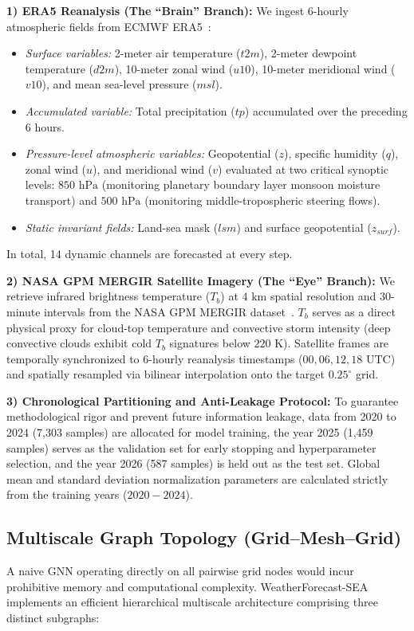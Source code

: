 \textbf{1) ERA5 Reanalysis (The ``Brain'' Branch):}
We ingest 6-hourly atmospheric fields from ECMWF ERA5~\cite{hersbach2020era5}:
\begin{itemize}
    \item \textit{Surface variables:} 2-meter air temperature ($t2m$), 2-meter dewpoint temperature ($d2m$), 10-meter zonal wind ($u10$), 10-meter meridional wind ($v10$), and mean sea-level pressure ($msl$).
    \item \textit{Accumulated variable:} Total precipitation ($tp$) accumulated over the preceding 6 hours.
    \item \textit{Pressure-level atmospheric variables:} Geopotential ($z$), specific humidity ($q$), zonal wind ($u$), and meridional wind ($v$) evaluated at two critical synoptic levels: $850\text{ hPa}$ (monitoring planetary boundary layer monsoon moisture transport) and $500\text{ hPa}$ (monitoring middle-tropospheric steering flows).
    \item \textit{Static invariant fields:} Land-sea mask ($lsm$) and surface geopotential ($z_{surf}$).
\end{itemize}
In total, 14 dynamic channels are forecasted at every step.

\textbf{2) NASA GPM MERGIR Satellite Imagery (The ``Eye'' Branch):}
We retrieve infrared brightness temperature ($T_b$) at $4\text{ km}$ spatial resolution and 30-minute intervals from the NASA GPM MERGIR dataset~\cite{janowiak2001mergir}. $T_b$ serves as a direct physical proxy for cloud-top temperature and convective storm intensity (deep convective clouds exhibit cold $T_b$ signatures below $220\text{ K}$). Satellite frames are temporally synchronized to 6-hourly reanalysis timestamps ($00, 06, 12, 18\text{ UTC}$) and spatially resampled via bilinear interpolation onto the target $0.25^\circ$ grid.

\textbf{3) Chronological Partitioning and Anti-Leakage Protocol:}
To guarantee methodological rigor and prevent future information leakage, data from 2020 to 2024 (7,303 samples) are allocated for model training, the year 2025 (1,459 samples) serves as the validation set for early stopping and hyperparameter selection, and the year 2026 (587 samples) is held out as the test set. Global mean and standard deviation normalization parameters are calculated strictly from the training years ($2020-2024$).

\subsection{Multiscale Graph Topology (Grid--Mesh--Grid)}
A naive GNN operating directly on all pairwise grid nodes would incur prohibitive memory and computational complexity. WeatherForecast-SEA implements an efficient hierarchical multiscale architecture comprising three distinct subgraphs:


